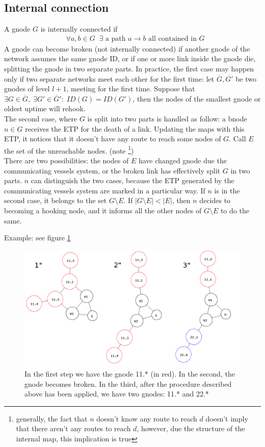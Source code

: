 \documentclass[a4paper]{article}
\newcommand{\T}[1]{\textrm{#1}}
\newcommand{\eal}[1]{{\begin{align*} #1 \end{align*}}}
\def\ove#1{{\overline{#1}}}
\def\-{{\setminus}}
\begin{document}
\subsection{Internal connection}
A gnode $G$ is internally connected if
\eal{&\forall a,b\in G\;\;\exists \T{ a path $a\rightarrow b$ all contained in $G$}}
A gnode can become broken (not internally connected) if another gnode of the
network assumes the same gnode ID, or if one or more link inside the gnode
die, splitting the gnode in two separate parts. In practice, the
first case may happen only if two separate networks meet each other for the
first time: let $\ove G, \ove {G'}$ be two gnodes of level $l+1$, meeting for the first time. 
Suppose that $\exists G\in \ove G,\;\exists G'\in \ove G':\; ID(G)=ID(G')$, then the nodes 
of the smallest gnode or oldest uptime will rehook.\\
The second case, where $G$ is split into two parts is handled as follow:
a bnode $n\in G$ receives the ETP for the death of a link.
Updating the maps with this ETP, it notices that it doesn't
have any route to reach some nodes of $G$. Call $E$ the set of
the unreachable nodes. (note \footnote{generally, the fact that $n$ doesn't
know any route to reach $d$ doesn't imply that there aren't any routes to
reach $d$, however, due the structure of the internal map, this implication is true})\\
There are two possibilities: the nodes of $E$ have changed
gnode due the communicating vessels system, or the broken link
has effectively split $G$ in two parts.
$n$ can distinguish the two cases, because the ETP generated
by the communicating vessels system are marked in a particular way.
If $n$ is in the second case, it belongs to the set $G\-E$. If
$|G\-E| < |E|$, then $n$ decides to becoming a hooking node, and it informs
all the other nodes of $G\-E$ to do the same.

Example: see figure \ref{fig:congnode}
\begin{figure}[h]
	\begin{center}
		\includegraphics[scale=0.5]{fig/congnode}
	\end{center}
	\caption{In the first step we have the gnode 11.* (in red). In the
	second, the gnode becomes broken. In the third, after the procedure
	described above has been applied, we have two gnodes: 11.* and 22.*}
	\label{fig:congnode}
\end{figure}
\end{document}
